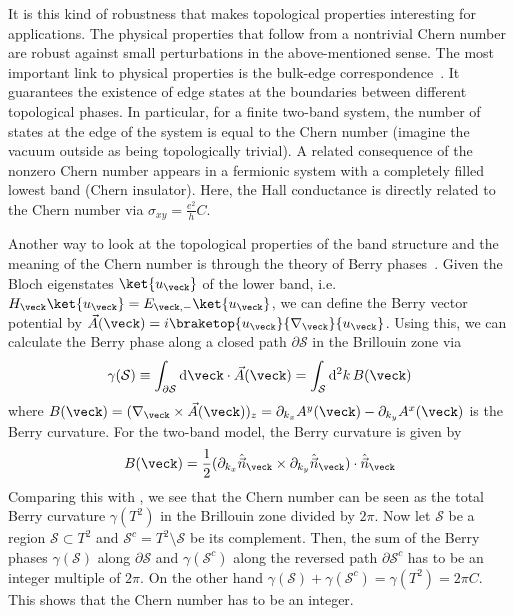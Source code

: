 It is this kind of robustness that makes topological properties interesting for applications.
The physical properties that follow from a nontrivial Chern number are robust against small perturbations in the above-mentioned sense.
The most important link to physical properties is the bulk-edge correspondence~\cite{Hatsugai1993}.
It guarantees the existence of edge states at the boundaries between different topological phases.
In particular, for a finite two-band system, the number of states at the edge of the system is equal to the Chern number (imagine the vacuum outside as being topologically trivial).
A related consequence of the nonzero Chern number appears in a fermionic system with a completely filled lowest band (Chern insulator).
Here, the Hall conductance is directly related to the Chern number via $\sigma_{xy} = \frac{e^2}{h} C$.

Another way to look at the topological properties of the band structure and the meaning of the Chern number is through the theory of Berry phases~\cite{Berry1984,Zak1989}.
Given the Bloch eigenstates $\ket{u_\veck}$ of the lower band, i.e. $H_\veck\ket{u_\veck} = E_{\veck,-} \ket{u_\veck}$, we can define the Berry vector potential by
$\vec{A}(\veck) = i \braketop{u_\veck}{\nabla_\veck}{u_\veck}$.
Using this, we can calculate the Berry phase along a closed path $\partial\mathcal{S}$ in the Brillouin zone via
\begin{align}
    \gamma(\mathcal{S}) \equiv \int_{\partial\mathcal{S}} \mathrm{d}\veck \cdot \vec{A}(\veck) = \int_\mathcal{S} \mathrm{d}^2 k \, B(\veck)
\end{align}
where $B(\veck) = (\nabla_\veck \times \vec{A}(\veck))_z = \partial_{k_x} A^y(\veck) - \partial_{k_y} A^x(\veck)$ is the Berry curvature.
For the two-band model, the Berry curvature is given by
\begin{align}
    B(\veck) = \frac{1}{2} ( \partial_{k_x} \hat{\vec{n}}_{\veck} \times \partial_{k_y} \hat{\vec{n}}_{\veck} ) \cdot \hat{\vec{n}}_{\veck}
\end{align}
Comparing this with , we see that the Chern number can be seen as the total Berry curvature $\gamma(T^2)$ in the Brillouin zone divided by $2\pi$.
Now let $\mathcal{S}$ be a region $\mathcal{S} \subset T^2$ and $\mathcal{S}^c = T^2 \setminus \mathcal{S}$ be its complement.
Then, the sum of the Berry phases $\gamma(\mathcal{S})$ along $\partial \mathcal{S}$ and $\gamma(\mathcal{S}^c)$ along the reversed path $\partial \mathcal{S}^c$ has to be an integer multiple of $2\pi$.
On the other hand $\gamma(\mathcal{S}) + \gamma(\mathcal{S}^c) = \gamma(T^2) = 2\pi C$. This shows that the Chern number has to be an integer.


